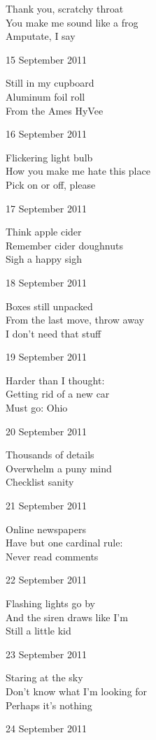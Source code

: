 \documentclass[12pt]{article}
\begin{document}
Thank you, scratchy throat \\
You make me sound like a frog \\
Amputate, I say

15 September 2011

Still in my cupboard \\
Aluminum foil roll \\
From the Ames HyVee

16 September 2011

Flickering light bulb \\
How you make me hate this place \\
Pick on or off, please


\newpage

17 September 2011

Think apple cider \\
Remember cider doughnuts \\
Sigh a happy sigh

18 September 2011

Boxes still unpacked \\
From the last move, throw away \\
I don't need that stuff

19 September 2011

Harder than I thought: \\
Getting rid of a new car \\
Must go: Ohio

20 September 2011

Thousands of details \\
Overwhelm a puny mind \\
Checklist sanity

21 September 2011

Online newspapers \\
Have but one cardinal rule: \\
Never read comments

22 September 2011

Flashing lights go by \\
And the siren draws like I'm \\
Still a little kid

23 September 2011

Staring at the sky \\
Don't know what I'm looking for \\
Perhaps it's nothing


\newpage

24 September 2011
\end{document}
